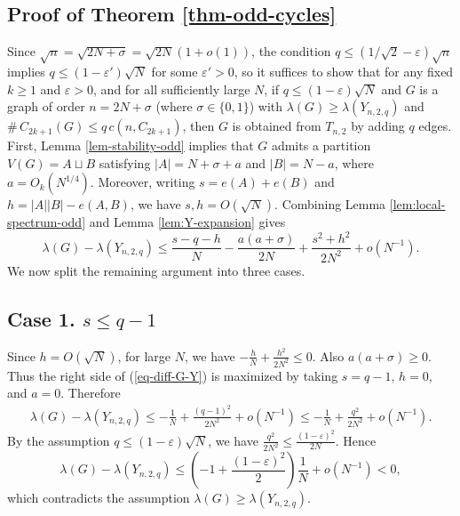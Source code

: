 \documentclass[11pt,a4paper]{article}
\theoremstyle{definition}
\theoremstyle{plain}
\newcommand{\eps}{\varepsilon}
\renewcommand{\le}{\leqslant}
\renewcommand{\ge}{\geqslant}
\begin{document}
\subsection{Proof of Theorem \ref{thm-odd-cycles}}


\label{sec:odd-cycle-lower}


Since $\sqrt{n} =\sqrt{2N+\sigma} = \sqrt{2N}(1+o(1))$, the condition $q\le (1/ \sqrt{2} - \eps)\sqrt{n}$ implies 
$q\le (1- \eps' )\sqrt{N}$ for some $\eps' >0$, so it suffices to show that for any fixed $k\ge 1$ and $\eps>0$, and for all sufficiently large $N$, if $ q\le (1-\eps)\sqrt N$  
and $G$ is a graph of order $n=2N+\sigma$ (where $\sigma \in \{0,1\}$) with $\lambda(G)\ge \lambda(Y_{n,2,q})$ and $ \texttt{\#}\, {C_{2k+1}}(G)\le q\, c(n, C_{2k+1})$, then  $G$ is obtained from $T_{n,2}$ by adding $q$ edges. First,  
 Lemma \ref{lem-stability-odd} implies that 
$G$ admits a partition $V(G)=A\sqcup B$ satisfying 
$|A|=N+\sigma +a$ and $|B|=N- a$, where $a=O_k(N^{1/4})$. Moreover, writing  
$s=e(A) + e(B)$ and $h=|A||B| - e(A,B)$, we have  
$ s,h=O(\sqrt N)$. 
 Combining Lemma \ref{lem:local-spectrum-odd} and  Lemma \ref{lem:Y-expansion} gives
\begin{equation} \label{eq-diff-G-Y}
        \lambda(G)-\lambda(Y_{n,2,q})
        \le
        \frac{s-q-h}{N}
        -\frac{a(a+\sigma)}{2N}
        +\frac{s^2+h^2}{2N^2}
        +o(N^{-1}).
\end{equation}
We now split the remaining argument into three cases.

\subsection*{Case 1. $s\le q-1$}

Since $h=O(\sqrt N)$, for large $N$, we have
$ -\frac hN+\frac{h^2}{2N^2}\le 0$. 
Also $a(a+\sigma)\ge0$.  Thus the right side of (\ref{eq-diff-G-Y}) is maximized by taking $s=q-1$, $h=0$, and $a=0$.  Therefore
\[
\begin{aligned}
        \lambda(G)-\lambda(Y_{n,2,q})
        \le
        -\frac1N+\frac{(q-1)^2}{2N^2}+o(N^{-1}) 
        \le
        -\frac1N+\frac{q^2}{2N^2}+o(N^{-1}).
\end{aligned}
\]
By the assumption $q\le (1- \varepsilon) \sqrt{N}$, we have $  \frac{q^2}{2N^2}\le \frac{(1-\eps)^2}{2N}$. 
Hence
\[
        \lambda(G)-\lambda(Y_{n,2,q})
        \le
        \left(-1+\frac{(1-\eps)^2}{2}\right)\frac1N+o(N^{-1})<0,
\]
which contradicts the assumption $\lambda(G)\ge\lambda(Y_{n,2,q})$. 
\end{document}
